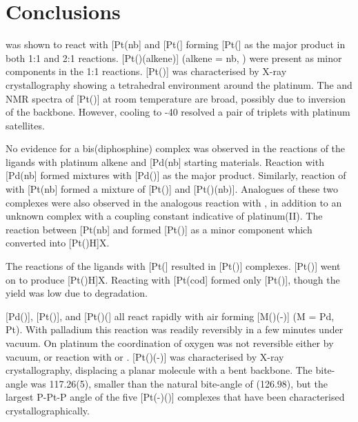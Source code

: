 
\section{Conclusions}

\PhThixantphos{} was shown to react with [Pt(nb] and [Pt(] forming [Pt(\Phthixantphos{}] as the major product in both 1:1 and 2:1 reactions. [Pt(\Phthixantphos)(alkene)] (alkene = nb, ) were present as minor components in the 1:1 reactions.  [Pt(\Phthixantphos)] was characterised by X-ray crystallography showing a tetrahedral environment around the platinum.  The \proton{} and \phosphorus{} NMR spectra of [Pt(\Phthixantphos)] at room temperature are broad, possibly due to inversion of the backbone.  However, cooling to -40\degC{}  resolved a pair of triplets with platinum satellites.  

No evidence for a bis(diphosphine) complex was observed in the reactions of the \tBuxantphos{} ligands with platinum alkene and [Pd(nb] starting materials.  Reaction with [Pd(nb] formed mixtures with [Pd(\tBuxantphos)] as the major product.  Similarly, reaction of \tButhixantphos{} with [Pt(nb] formed a mixture of [Pt(\tButhixantphos)] and [Pt(\tButhixantphos)(nb)].  Analogues of these two complexes were also observed in the analogous reaction with \tBusixantphos{}, in addition to an unknown complex with a coupling constant indicative of platinum(II).  The reaction between [Pt(nb] and \tBuxantphos{} formed [Pt(\tBuxantphos)] as a minor component which converted into [Pt(\tBuxantphos)H]X.  

The reactions of the \tBuxantphos{} ligands with [Pt(] resulted in [Pt(\tBuxantphos)] complexes.  [Pt(\tBuxantphos)] went on to produce [Pt(\tBuxantphos)H]X.  Reacting \tButhixantphos{} with [Pt(cod] formed only [Pt(\tButhixantphos)], though the yield was low due to degradation.

[Pd(\tButhixantphos)], [Pt(\tButhixantphos)], and [Pt(\tButhixantphos)(] all react rapidly with air forming [M(\tButhixantphos)(-)] (M = Pd, Pt).  With palladium this reaction was readily reversibly in a few minutes under vacuum.  On platinum the coordination of oxygen was not reversible either by vacuum, or reaction with  or .  [Pt(\tButhixantphos)(-)] was characterised by X-ray crystallography, displacing a planar molecule with a bent \tButhixantphos{} backbone.  The bite-angle was 117.26(5), smaller than the natural bite-angle of (126.98\degrees{}), but the largest P-Pt-P angle of the five [Pt(-)()] complexes that have been characterised crystallographically.  

